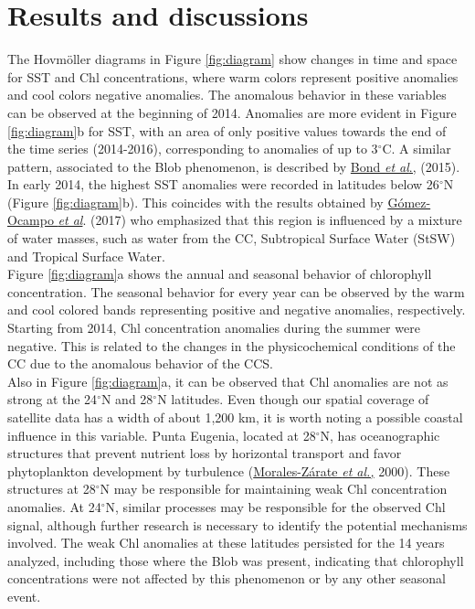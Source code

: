 \documentclass{article} %
\begin{document}
\section{Results and discussions}

The Hovmöller diagrams in Figure \ref{fig:diagram} show changes in time and space for SST and Chl concentrations, where warm colors represent positive anomalies and cool colors negative anomalies. The anomalous behavior in these variables can be observed at the beginning of 2014. Anomalies are more evident in Figure \ref{fig:diagram}b for SST, with an area of only positive values towards the end of the time series (2014-2016), corresponding to anomalies of up to 3$^{\circ}$C. A similar pattern, associated to the Blob phenomenon, is described by \hyperlink{bond}{Bond \textit{et al}.,} (2015).\\

In early 2014, the highest SST anomalies were recorded in latitudes below 26$^{\circ}$N (Figure \ref{fig:diagram}b). This coincides with the results obtained by \hyperlink{gomez}{Gómez-Ocampo \textit{et al}}. (2017) who emphasized that this region is influenced by a mixture of water masses, such as water from the CC, Subtropical Surface Water (StSW) and Tropical Surface Water.\\

Figure \ref{fig:diagram}a shows the annual and seasonal behavior of chlorophyll concentration. The seasonal behavior for every year can be observed by the warm and cool colored bands representing positive and negative anomalies, respectively. Starting from 2014, Chl concentration anomalies during the summer were negative. This is related to the changes in the physicochemical conditions of the CC due to the anomalous behavior of the CCS.\\

Also in Figure \ref{fig:diagram}a, it can be observed that Chl anomalies are not as strong at the 24$^{\circ}$N and 28$^{\circ}$N latitudes. Even though our spatial coverage of satellite data has a width of about 1,200 km, it is worth noting a possible coastal influence in this variable. Punta Eugenia, located at 28$^{\circ}$N, has oceanographic structures that prevent nutrient loss by horizontal transport and favor phytoplankton development by turbulence (\hyperlink{morales}{Morales-Zárate \textit{et al.,}} 2000). These structures at 28$^{\circ}$N may be responsible for maintaining weak Chl concentration anomalies. At 24$^{\circ}$N, similar processes may be responsible for the observed Chl signal, although further research is necessary to identify the potential mechanisms involved. The weak Chl anomalies at these latitudes persisted for the 14 years analyzed, including those where the Blob was present, indicating that chlorophyll concentrations were not affected by this phenomenon or by any other seasonal event.\\
\end{document}
